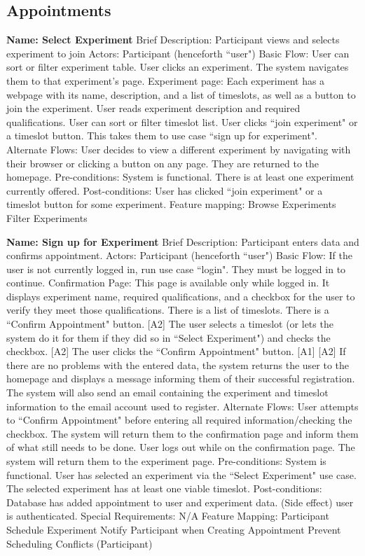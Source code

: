 \subsection{Appointments}
\begin{outline}[enumerate]


\1 {\bf Name: Select Experiment}
\2 Brief Description: Participant views and selects experiment to join
\2 Actors: Participant (henceforth ``user")
\2 Basic Flow:
\3 User can sort or filter experiment table.
\3 User clicks an experiment.  The system navigates them to that experiment's page.
\3 Experiment page: Each experiment has a webpage with its name, description, and a list of timeslots, as well as a button to join the experiment.
\3 User reads experiment description and required qualifications.
\3 User can sort or filter timeslot list.
\3 User clicks ``join experiment" or a timeslot button.  This takes them to use case ``sign up for experiment".
\2 Alternate Flows:
\3 [A1] User decides to view a different experiment by navigating with their browser or clicking a button on any page.  They are returned to the homepage.
\2 Pre-conditions:
\3 System is functional.
\3 There is at least one experiment currently offered.
\2 Post-conditions:
\3 User has clicked ``join experiment" or a timeslot button for some experiment.
\2 Feature mapping:
\3 Browse Experiments
\3 Filter Experiments

\1 {\bf Name: Sign up for Experiment}
\2 Brief Description: Participant enters data and confirms appointment.
\2 Actors: Participant (henceforth ``user")
\2 Basic Flow:
\3 If the user is not currently logged in, run use case ``login".  They must be logged in to continue.
\3 Confirmation Page: This page is available only while logged in.  It displays experiment name, required qualifications, and a checkbox for the user to verify they meet those qualifications. There is a list of timeslots. There is a ``Confirm Appointment" button. [A2]
\3 The user selects a timeslot (or lets the system do it for them if they did so in ``Select Experiment") and checks the checkbox. [A2]
\3 The user clicks the ``Confirm Appointment" button. [A1] [A2]
\3 If there are no problems with the entered data, the system returns the user to the homepage and displays a message informing them of their successful registration.  The system will also send an email containing the experiment and timeslot information to the email account used to register.
\2 Alternate Flows:
\3 [A1] User attempts to ``Confirm Appointment" before entering all required information/checking the checkbox.
\4 The system will return them to the confirmation page and inform them of what still needs to be done.
\3 [A2] User logs out while on the confirmation page.  The system will return them to the experiment page.
\2 Pre-conditions:
\3 System is functional.
\3 User has selected an experiment via the ``Select Experiment" use case.
\3 The selected experiment has at least one viable timeslot.
\2 Post-conditions:
\3 Database has added appointment to user and experiment data.
\3 (Side effect) user is authenticated.
\2 Special Requirements:
\3 N/A
\2 Feature Mapping:
\3 Participant Schedule Experiment
\3 Notify Participant when Creating Appointment
\3 Prevent Scheduling Conflicts (Participant)

\end{outline}
